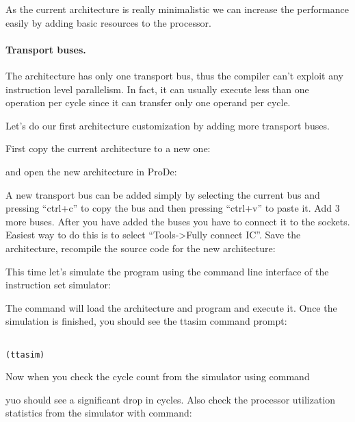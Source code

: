 \documentclass[twoside]{tceusermanual}
\begin{document}
As the current architecture is really minimalistic we can increase the
performance easily by adding basic resources to the processor.

\paragraph{Transport buses.}

The architecture has only one transport bus, thus the compiler can't exploit
any instruction level parallelism. In fact, it can usually execute less than
one operation per cycle since it can transfer only one operand per cycle.

Let's do our first architecture customization by adding more transport buses.

First copy the current architecture to a new one:


and open the new architecture in ProDe:


A new transport bus can be added simply by selecting the current bus and
pressing ``ctrl+c'' to copy the bus and then pressing ``ctrl+v'' to paste it.
Add 3 more buses. After you have added the buses you have to connect it to the
sockets. Easiest way to do this is to select ``Tools->Fully connect IC''.
Save the architecture, recompile the source code for the new architecture:


This time let's simulate the program using the command line interface of the
instruction set simulator:


The command will load the architecture and program and execute
it. Once the simulation is finished, you should see the ttasim command prompt:

\begin{verbatim}

(ttasim) 
\end{verbatim}

Now when you check the cycle count from the simulator using command


yuo should see a significant drop in cycles.
Also check the processor utilization statistics from the simulator
with command:
\end{document}
